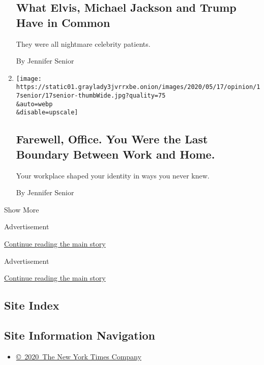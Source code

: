 \begin{enumerate}
  \hypertarget{what-elvis-michael-jackson-and-trump-have-in-common}{%
  \subsection{What Elvis, Michael Jackson and Trump Have in
  Common}\label{what-elvis-michael-jackson-and-trump-have-in-common}}

  They were all nightmare celebrity patients.

  By Jennifer Senior
\item
  \href{/2020/05/17/opinion/coronavirus-office-telecommuting.html}{}

  \texttt{[image: https://static01.graylady3jvrrxbe.onion/images/2020/05/17/opinion/17senior/17senior-thumbWide.jpg?quality=75\\\&auto=webp\\\&disable=upscale]}

  \hypertarget{farewell-office-you-were-the-last-boundary-between-work-and-home}{%
  \subsection{Farewell, Office. You Were the Last Boundary Between Work
  and
  Home.}\label{farewell-office-you-were-the-last-boundary-between-work-and-home}}

  Your workplace shaped your identity in ways you never knew.

  By Jennifer Senior
\end{enumerate}

Show More

Advertisement

\protect\hyperlink{after-mid1}{Continue reading the main story}

Advertisement

\protect\hyperlink{after-mktg}{Continue reading the main story}

\hypertarget{site-index}{%
\subsection{Site Index}\label{site-index}}

\hypertarget{site-information-navigation}{%
\subsection{Site Information
Navigation}\label{site-information-navigation}}

\begin{itemize}
\tightlist
\item
  \href{https://help.nytimes3xbfgragh.onion/hc/en-us/articles/115014792127-Copyright-notice}{©~2020~The
  New York Times Company}
\end{itemize}

